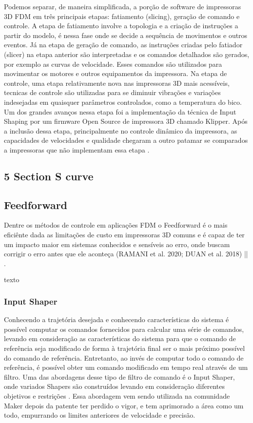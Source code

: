 Podemos separar, de maneira simplificada, a porção de software de impressoras 3D
FDM em três principais etapas: fatiamento (slicing), geração de comando e controle.
A etapa de fatiamento involve a topologia e a criação de instruções a partir do modelo,
é nessa fase onde se decide a sequência de movimentos e outros eventos.
Já na etapa de geração de comando, as instruções criadas pelo fatiador (slicer) na etapa anterior
são interpretadas e os comandos detalhados são gerados, por exemplo as curvas de velocidade.
Esses comandos são utilizados para movimentar os motores e outros equipamentos da impressora.
Na etapa de controle, uma etapa relativamente nova nas impressoras 3D mais acessíveis, 
tecnicas de controle são utilizadas para se diminuir vibrações e variações indesejadas em quaisquer
parâmetros controlados, como a temperatura do bico. Um dos grandes avanços nessa etapa
foi a implementação da técnica de Input Shaping por um firmware Open Source de impressora 3D chamado Klipper.
Após a inclusão dessa etapa, principalmente no controle dinâmico da impressora, as capacidades
de velocidades e qualidade chegaram a outro patamar se comparados a impressoras que não implementam essa etapa \cite{klipperdoc}.

\subsection{5 Section S curve}

\subsection{Feedforward}
Dentre os métodos de controle em aplicações FDM o Feedforward 
é o mais eficiênte dada as limitações de custo em impressoras 
3D comuns e é capaz de ter um impacto maior em sistemas 
conhecidos e sensíveis ao erro, onde buscam corrigir o erro 
antes que ele aconteça (RAMANI et al. 2020; DUAN et al. 2018) || \cite{ramani20}\cite{duan18}.

texto

\subsubsection{Input Shaper}
Conhecendo a trajetória desejada e conhecendo características 
do sistema é possível computar os comandos fornecidos para 
calcular uma série de comandos, levando em consideração as 
características do sistema para que o comando de referência 
seja modificado de forma à trajetória final ser o mais próximo 
possível do comando de referência. Entretanto, ao invés de 
computar todo o comando de referência, é possível obter um 
comando modificado em tempo real através de um filtro. 
Uma das abordagens desse tipo de filtro de comando é o 
Input Shaper, onde variados Shapers são construídos levando 
em consideração diferentes objetivos e restrições 
\cite{singhose97}.
Essa abordagem vem sendo utilizada na comunidade Maker depois 
da patente ter perdido o vigor, e tem aprimorado a área como
um todo, empurrando os limites anteriores de velocidade e 
precisão.

